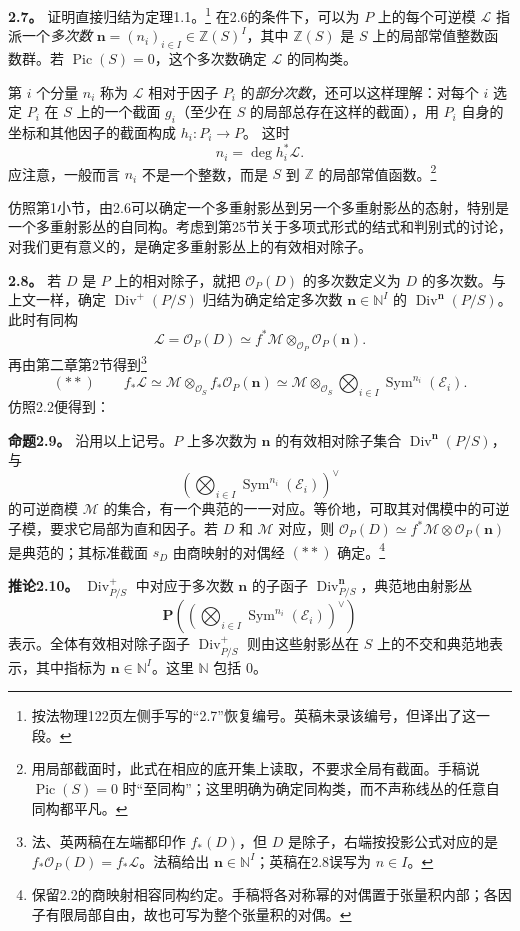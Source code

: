 \documentclass[openany,fontset=fandol]{ctexbook}
\newcommand{\OO}{\mathcal O}
\newcommand{\LL}{\mathcal L}
\newcommand{\MM}{\mathcal M}
\newcommand{\EE}{\mathcal E}
\newcommand{\nn}{\boldsymbol n}
\DeclareMathOperator{\Pic}{Pic}
\DeclareMathOperator{\Sym}{Sym}
\DeclareMathOperator{\Div}{Div}
\begin{document}
\medskip\noindent\textbf{2.7。}
证明直接归结为定理1.1。\footnote{按法物理122页左侧手写的“2.7”恢复编号。英稿未录该编号，但译出了这一段。}
在2.6的条件下，可以为 \(P\) 上的每个可逆模 \(\LL\) 指派一个\emph{多次数}
\(\nn=(n_i)_{i\in I}\in\mathbb Z(S)^I\)，其中 \(\mathbb Z(S)\) 是 \(S\) 上的局部常值整数函数群。若 \(\Pic(S)=0\)，这个多次数确定 \(\LL\) 的同构类。

第 \(i\) 个分量 \(n_i\) 称为 \(\LL\) 相对于因子 \(P_i\) 的\emph{部分次数}，还可以这样理解：对每个 \(i\) 选定 \(P_i\) 在 \(S\) 上的一个截面 \(g_i\)（至少在 \(S\) 的局部总存在这样的截面），用 \(P_i\) 自身的坐标和其他因子的截面构成
\(h_i:P_i\to P\)。
这时
\[
 n_i=\deg h_i^*\LL.
\]
应注意，一般而言 \(n_i\) 不是一个整数，而是 \(S\) 到 \(\mathbb Z\) 的局部常值函数。\footnote{用局部截面时，此式在相应的底开集上读取，不要求全局有截面。手稿说 \(\Pic(S)=0\) 时“至同构”；这里明确为确定同构类，而不声称线丛的任意自同构都平凡。}

仿照第1小节，由2.6可以确定一个多重射影丛到另一个多重射影丛的态射，特别是一个多重射影丛的自同构。考虑到第25节关于多项式形式的结式和判别式的讨论，对我们更有意义的，是确定多重射影丛上的有效相对除子。

\medskip\noindent\textbf{2.8。}
若 \(D\) 是 \(P\) 上的相对除子，就把 \(\OO_P(D)\) 的多次数定义为 \(D\) 的多次数。与上文一样，确定 \(\Div^+(P/S)\) 归结为确定给定多次数 \(\nn\in\mathbb N^I\) 的 \(\Div^{\nn}(P/S)\)。此时有同构
\[
 \LL=\OO_P(D)\simeq f^*\MM\otimes_{\OO_P}\OO_P(\nn).
\]
再由第二章第2节得到\footnote{法、英两稿在左端都印作 \(f_*(D)\)，但 \(D\) 是除子，右端按投影公式对应的是 \(f_*\OO_P(D)=f_*\LL\)。法稿给出 \(\nn\in\mathbb N^I\)；英稿在2.8误写为 \(n\in I\)。}
\[
 (**)\qquad
 f_*\LL\simeq\MM\otimes_{\OO_S} f_*\OO_P(\nn)
       \simeq\MM\otimes_{\OO_S}
                \bigotimes_{i\in I}\Sym^{n_i}(\EE_i).
\]
仿照2.2便得到：

\medskip\noindent\textbf{命题2.9。}
沿用以上记号。\(P\) 上多次数为 \(\nn\) 的有效相对除子集合 \(\Div^{\nn}(P/S)\)，与
\[
 \left(\bigotimes_{i\in I}\Sym^{n_i}(\EE_i)\right)^\vee
\]
的可逆商模 \(\MM\) 的集合，有一个典范的一一对应。等价地，可取其对偶模中的可逆子模，要求它局部为直和因子。若 \(D\) 和 \(\MM\) 对应，则
\(\OO_P(D)\simeq f^*\MM\otimes\OO_P(\nn)\)
是典范的；其标准截面 \(s_D\) 由商映射的对偶经 \((**)\) 确定。\footnote{保留2.2的商映射相容同构约定。手稿将各对称幂的对偶置于张量积内部；各因子有限局部自由，故也可写为整个张量积的对偶。}

\medskip\noindent\textbf{推论2.10。}
\(\Div^+_{P/S}\) 中对应于多次数 \(\nn\) 的子函子 \(\Div^{\nn}_{P/S}\)，典范地由射影丛
\[
 \mathbf P\left(
 \left(\bigotimes_{i\in I}\Sym^{n_i}(\EE_i)\right)^\vee
 \right)
\]
表示。全体有效相对除子函子 \(\Div^+_{P/S}\) 则由这些射影丛在 \(S\) 上的不交和典范地表示，其中指标为 \(\nn\in\mathbb N^I\)。这里 \(\mathbb N\) 包括 \(0\)。
\end{document}
